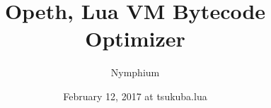 \documentclass[aspectratio=169,unicode,compress,14pt]{beamer}
\title{\Opeth}
\author{\footnotesize{}Nymphium}
\date{\footnotesize{}February 12, 2017 at tsukuba.lua}
\def\aatitle{Opeth, Lua VM Bytecode Optimizer}
\begin{document}
\bgroup
\theking
\maketitle
\egroup
\title{\aatitle}
\switchfooter






\end{document}
